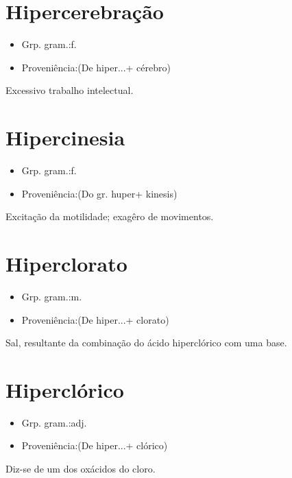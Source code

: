 \documentclass{article}
\begin{document}
\section{Hipercerebração}
\begin{itemize}
\item {Grp. gram.:f.}
\end{itemize}
\begin{itemize}
\item {Proveniência:(De \textunderscore hiper...\textunderscore  + \textunderscore cérebro\textunderscore )}
\end{itemize}
Excessivo trabalho intelectual.
\section{Hipercinesia}
\begin{itemize}
\item {Grp. gram.:f.}
\end{itemize}
\begin{itemize}
\item {Proveniência:(Do gr. \textunderscore huper\textunderscore  + \textunderscore kinesis\textunderscore )}
\end{itemize}
Excitação da motilidade; exagêro de movimentos.
\section{Hiperclorato}
\begin{itemize}
\item {Grp. gram.:m.}
\end{itemize}
\begin{itemize}
\item {Proveniência:(De \textunderscore hiper...\textunderscore  + \textunderscore clorato\textunderscore )}
\end{itemize}
Sal, resultante da combinação do ácido hiperclórico com uma base.
\section{Hiperclórico}
\begin{itemize}
\item {Grp. gram.:adj.}
\end{itemize}
\begin{itemize}
\item {Proveniência:(De \textunderscore hiper...\textunderscore  + \textunderscore clórico\textunderscore )}
\end{itemize}
Diz-se de um dos oxácidos do cloro.
\end{document}
